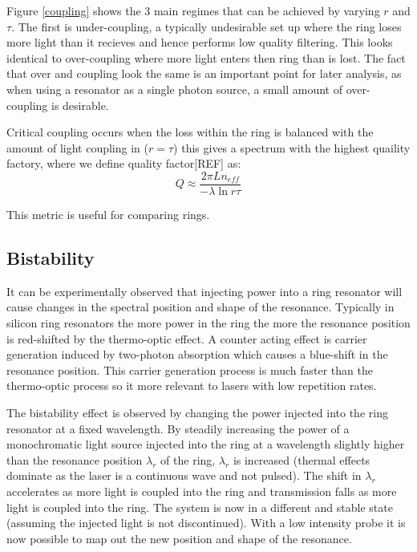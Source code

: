 Figure \ref{coupling} shows the 3 main regimes that can be achieved by varying $r$ and $\tau$. The first is under-coupling, a typically undesirable set up where the ring loses more light than it recieves and hence performs low quality filtering. This looks identical to over-coupling where more light enters then ring than is lost. The fact that over and coupling look the same is an important point for later analysis, as when using a resonator as a single photon source, a small amount of over-coupling is desirable. 

Critical coupling occurs when the loss within the ring is balanced with the amount of light coupling in ($r=\tau$) this gives a spectrum with the highest quaility factory, where we define quality factor[REF] as:
\begin{equation}
Q \approx \frac{2\pi L n_{eff}}{-\lambda \ln{r\tau}}
\end{equation}

This metric is useful for comparing rings. 

\subsection{Bistability}
It can be experimentally observed that injecting power into a ring resonator will cause changes in the spectral position and shape of the resonance. Typically in silicon ring resonators the more power in the ring the more the resonance position is red-shifted by the thermo-optic effect\cite{almeida_optical_2004-1}. A counter acting effect is carrier generation induced by two-photon absorption \cite{xu_carrier-induced_2006} which causes a blue-shift in the resonance position. This carrier generation process is much faster than the thermo-optic process so it more relevant to lasers with low repetition rates. 

The bistability effect is observed by changing the power injected into the ring resonator at a fixed wavelength. By steadily increasing the power of a monochromatic light source injected into the ring at a wavelength slightly higher than the resonance position $\lambda_{r}$ of the ring, $\lambda_{r}$ is increased (thermal effects dominate as the laser is a continuous wave and not pulsed). The shift in $\lambda_{r}$ accelerates as more light is coupled into the ring and transmission falls as more light is coupled into the ring. The system is now in a different and stable state (assuming the injected light is not discontinued). With a low intensity probe it is now possible to map out the new position and shape of the resonance.

